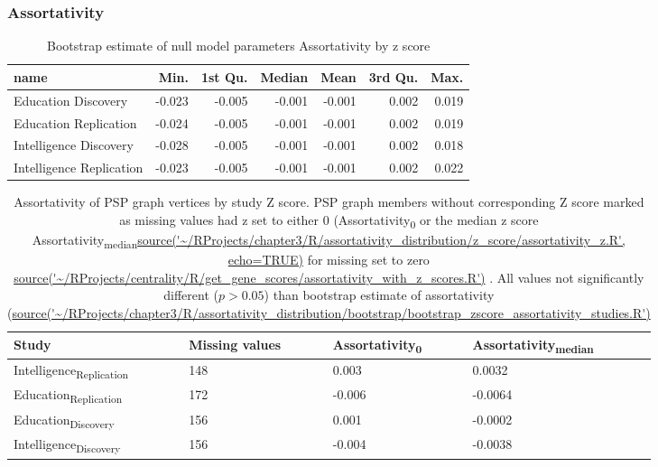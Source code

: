 \subsubsection{Assortativity}
\begin{table}[ht]
\centering
\begin{tabular}{lrrrrrr}
  \toprule
name & Min. & 1st Qu. & Median & Mean & 3rd Qu. & Max. \\ 
  \midrule
Education Discovery & -0.023 & -0.005 & -0.001 & -0.001 & 0.002 & 0.019 \\ 
  Education Replication & -0.024 & -0.005 & -0.001 & -0.001 & 0.002 & 0.019 \\ 
  Intelligence Discovery & -0.028 & -0.005 & -0.001 & -0.001 & 0.002 & 0.018 \\ 
  Intelligence Replication & -0.023 & -0.005 & -0.001 & -0.001 & 0.002 & 0.022 \\ 
   \bottomrule
\end{tabular}
\caption{Bootstrap estimate of null model parameters Assortativity by z score}
\label{tab:Bootstrap estimate of null model parameters Assortativity by z score}
\end{table}


\begin{table}[]
     \centering
     \begin{tabular}{llll}
     \toprule
         Study & Missing values  & Assortativity\textsubscript{0} & Assortativity\textsubscript{median}\\
         \midrule
         Intelligence\textsubscript{Replication} & 148 & 0.003 & 0.0032\\
         Education\textsubscript{Replication} & 172 & -0.006 &  -0.0064\\
         Education\textsubscript{Discovery} & 156 & 0.001 & -0.0002\\
         Intelligence\textsubscript{Discovery} & 156 & -0.004 & -0.0038\\
         \bottomrule
     \end{tabular}
     \caption{Assortativity of PSP graph vertices by study Z score. PSP graph members without corresponding Z score marked as missing values had z set to either 0 (Assortativity\textsubscript{0} or the median z score Assortativity\textsubscript{median}\url{source('~/RProjects/chapter3/R/assortativity_distribution/z_score/assortativity_z.R', echo=TRUE)} for missing set to zero \url{source('~/RProjects/centrality/R/get_gene_scores/assortativity_with_z_scores.R')} . All values not significantly different ($p>0.05$) than bootstrap estimate of assortativity (\url{source('~/RProjects/chapter3/R/assortativity_distribution/bootstrap/bootstrap_zscore_assortativity_studies.R')} }
     \label{tab:Assortativity of PSP graph and z scores}
 \end{table}
 
